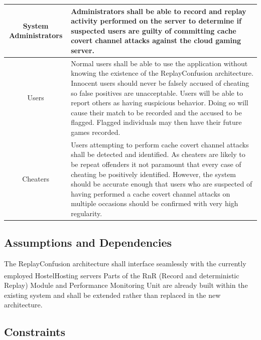 \documentclass[12pt]{article}
\begin{document}
\begin{center}
    \begin{tabularx}{\linewidth}{|c|X|}
        \hline
        System Administrators & Administrators shall be able to record and replay activity performed on the
        server to determine if suspected users are guilty of committing cache covert channel attacks against
        the cloud gaming server.\\
        \hline
        Users & Normal users shall be able to use the application without knowing the existence of the
        ReplayConfusion architecture. Innocent users should never be falsely accused of cheating so false
        positives are unacceptable. Users will be able to report others as having suspicious behavior. Doing
        so will cause their match to be recorded and the accused to be flagged. Flagged individuals may then
        have their future games recorded.\\
        \hline
        Cheaters & Users attempting to perform cache covert channel attacks shall be detected and identified.
        As cheaters are likely to be repeat offenders it not paramount that every case of cheating be positively
        identified. However, the system should be accurate enough that users who are suspected of having performed
        a cache covert channel attacks on multiple occasions should be confirmed with very high regularity.\\
        \hline
    \end{tabularx}
\end{center}

\subsection{Assumptions and Dependencies}

The ReplayConfusion architecture shall interface seamlessly with the currently employed
HostelHosting\textsuperscript{\tiny\textregistered} servers Parts of the RnR (Record and deterministic Replay)
Module and Performance Monitoring Unit are already built within the existing system and shall be extended rather
than replaced in the new architecture.

\subsection{Constraints}
\end{document}
